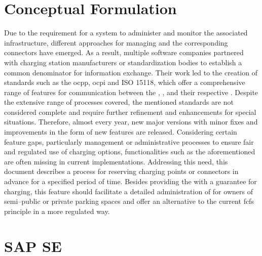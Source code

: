 \newpage

\section{Conceptual Formulation}
\label{ch:Introduction:sec:Conceptual Formulation}

Due to the requirement for a system to administer and monitor the associated infrastructure, different approaches for managing  and the corresponding connectors have emerged.
As a result, multiple software companies partnered with charging station manufacturers or standardization bodies to establish a common denominator for information exchange.
Their work led to the creation of standards such as the \acrfull{ocpp}, \acrfull{ocpi} and ISO 15118, which offer a comprehensive range of features for communication between the , , and their respective .
Despite the extensive range of processes covered, the mentioned standards are not considered complete and require further refinement and enhancements for special situations.
Therefore, almost every year, new major versions with minor fixes and improvements in the form of new features are released. 
Considering certain feature gaps, particularly management or administrative processes to ensure fair and regulated use of charging options, functionalities such as the aforementioned are often missing in current implementations. 
Addressing this need, this document describes a process for reserving charging points or connectors in advance for a specified period of time.
Besides providing the  with a guarantee for charging, this feature should facilitate a detailed administration of  for owners of semi--public or private parking spaces and offer an alternative to the current \acrfull{fcfs} principle in a more regulated way.

\section{SAP SE}
\label{ch:Introduction:sec:SAP SE}

